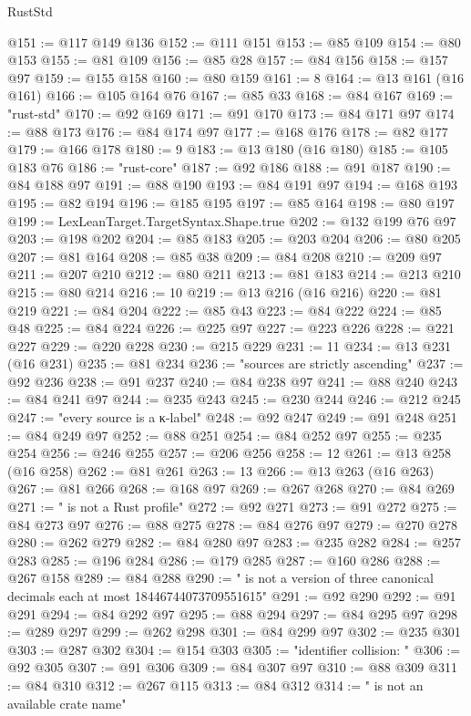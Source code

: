 \begin{lexlean}{RustStd}
\begin{coremodule}
{\begin{coremodule}
{{{{{{{{{{{{{{{{{{{{{{{{{{{{{{{{{{{{{{{{{{{{{{{{{{{{{{@151 := @117 @149 @136
@152 := @111 @151
@153 := @85 @109
@154 := @80 @153
@155 := @81 @109
@156 := @85 @28
@157 := @84 @156
@158 := @157 @97
@159 := @155 @158
@160 := @80 @159
@161 := 8
@164 := @13 @161 (@16 @161)
@166 := @105 @164 @76
@167 := @85 @33
@168 := @84 @167
@169 := "rust-std"
@170 := @92 @169
@171 := @91 @170
@173 := @84 @171 @97
@174 := @88 @173
@176 := @84 @174 @97
@177 := @168 @176
@178 := @82 @177
@179 := @166 @178
@180 := 9
@183 := @13 @180 (@16 @180)
@185 := @105 @183 @76
@186 := "rust-core"
@187 := @92 @186
@188 := @91 @187
@190 := @84 @188 @97
@191 := @88 @190
@193 := @84 @191 @97
@194 := @168 @193
@195 := @82 @194
@196 := @185 @195
@197 := @85 @164
@198 := @80 @197
@199 := LexLeanTarget.TargetSyntax.Shape.true
@202 := @132 @199 @76 @97
@203 := @198 @202
@204 := @85 @183
@205 := @203 @204
@206 := @80 @205
@207 := @81 @164
@208 := @85 @38
@209 := @84 @208
@210 := @209 @97
@211 := @207 @210
@212 := @80 @211
@213 := @81 @183
@214 := @213 @210
@215 := @80 @214
@216 := 10
@219 := @13 @216 (@16 @216)
@220 := @81 @219
@221 := @84 @204
@222 := @85 @43
@223 := @84 @222
@224 := @85 @48
@225 := @84 @224
@226 := @225 @97
@227 := @223 @226
@228 := @221 @227
@229 := @220 @228
@230 := @215 @229
@231 := 11
@234 := @13 @231 (@16 @231)
@235 := @81 @234
@236 := "sources are strictly ascending"
@237 := @92 @236
@238 := @91 @237
@240 := @84 @238 @97
@241 := @88 @240
@243 := @84 @241 @97
@244 := @235 @243
@245 := @230 @244
@246 := @212 @245
@247 := "every source is a κ-label"
@248 := @92 @247
@249 := @91 @248
@251 := @84 @249 @97
@252 := @88 @251
@254 := @84 @252 @97
@255 := @235 @254
@256 := @246 @255
@257 := @206 @256
@258 := 12
@261 := @13 @258 (@16 @258)
@262 := @81 @261
@263 := 13
@266 := @13 @263 (@16 @263)
@267 := @81 @266
@268 := @168 @97
@269 := @267 @268
@270 := @84 @269
@271 := " is not a Rust profile"
@272 := @92 @271
@273 := @91 @272
@275 := @84 @273 @97
@276 := @88 @275
@278 := @84 @276 @97
@279 := @270 @278
@280 := @262 @279
@282 := @84 @280 @97
@283 := @235 @282
@284 := @257 @283
@285 := @196 @284
@286 := @179 @285
@287 := @160 @286
@288 := @267 @158
@289 := @84 @288
@290 := " is not a version of three canonical decimals each at most 18446744073709551615"
@291 := @92 @290
@292 := @91 @291
@294 := @84 @292 @97
@295 := @88 @294
@297 := @84 @295 @97
@298 := @289 @297
@299 := @262 @298
@301 := @84 @299 @97
@302 := @235 @301
@303 := @287 @302
@304 := @154 @303
@305 := "identifier collision: "
@306 := @92 @305
@307 := @91 @306
@309 := @84 @307 @97
@310 := @88 @309
@311 := @84 @310
@312 := @267 @115
@313 := @84 @312
@314 := " is not an available crate name"
}}}}}}}}}}}}}}}}}}}}}}}}}}}}}}}}}}}}}}}}}}}}}}}}}}}}}}
\end{coremodule}}
\end{coremodule}
\end{lexlean}
